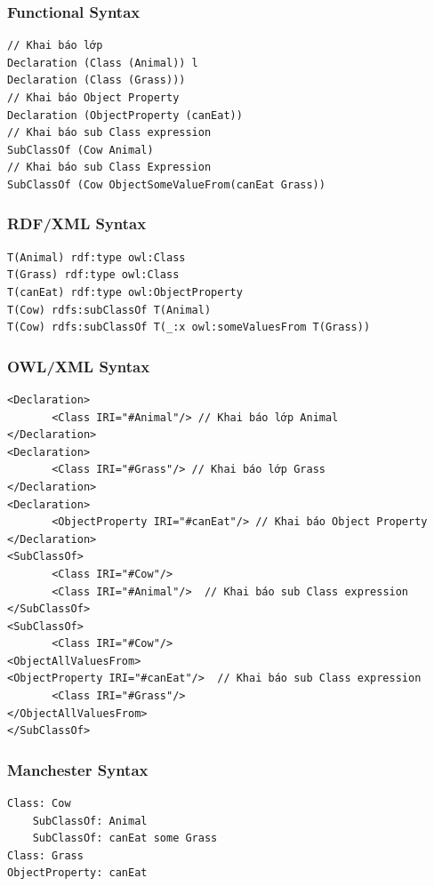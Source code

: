 \subsubsection{Functional Syntax}
\begin{verbatim}
// Khai báo lớp
Declaration (Class (Animal)) l
Declaration (Class (Grass))) 
// Khai báo Object Property
Declaration (ObjectProperty (canEat))  
// Khai báo sub Class expression
SubClassOf (Cow Animal)  
// Khai báo sub Class Expression
SubClassOf (Cow ObjectSomeValueFrom(canEat Grass))  
\end{verbatim}
\subsubsection{RDF/XML Syntax}
\begin{verbatim}
T(Animal) rdf:type owl:Class
T(Grass) rdf:type owl:Class
T(canEat) rdf:type owl:ObjectProperty
T(Cow) rdfs:subClassOf T(Animal) 
T(Cow) rdfs:subClassOf T(_:x owl:someValuesFrom T(Grass))
\end{verbatim}
\subsubsection{OWL/XML Syntax}
\begin{verbatim}
<Declaration>
       <Class IRI="#Animal"/> // Khai báo lớp Animal
</Declaration>
<Declaration>
       <Class IRI="#Grass"/> // Khai báo lớp Grass
</Declaration>
<Declaration>
       <ObjectProperty IRI="#canEat"/> // Khai báo Object Property 
</Declaration>
<SubClassOf>
       <Class IRI="#Cow"/>
       <Class IRI="#Animal"/>  // Khai báo sub Class expression
</SubClassOf>
<SubClassOf>
       <Class IRI="#Cow"/>
<ObjectAllValuesFrom>
<ObjectProperty IRI="#canEat"/>  // Khai báo sub Class expression
       <Class IRI="#Grass"/>
</ObjectAllValuesFrom>
</SubClassOf>
\end{verbatim}
\subsubsection{Manchester Syntax}
\begin{verbatim}
Class: Cow 
    SubClassOf: Animal 
    SubClassOf: canEat some Grass
Class: Grass
ObjectProperty: canEat
\end{verbatim}
